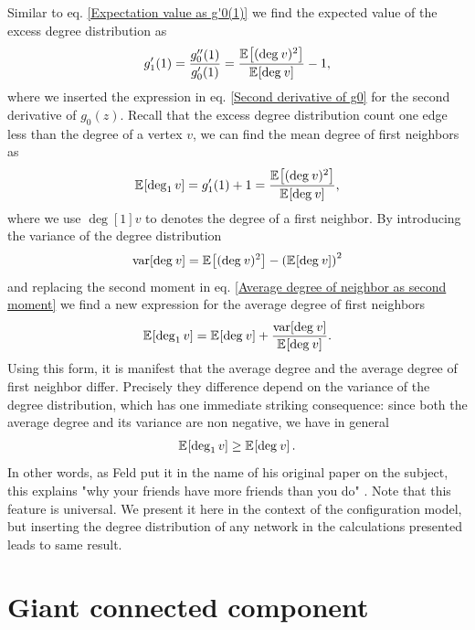 \documentclass[
11pt, %
english, %
singlespacing, %
nolistspacing, %
liststotoc, %
headsepline, %
]{MastersDoctoralThesis} %
\begin{document}
Similar to eq. \eqref{Expectation value as g'0(1)} we find the expected value of the excess degree distribution as
\begin{align}
	g'_1(1) = \frac{g''_0(1)}{g'_0(1)} = \frac{\expected{(\deg{v})^2}}{\expected{\deg{v}}} - 1,
\end{align}
where we inserted the expression in eq. \eqref{Second derivative of g0} for the second derivative of $g_0(z)$. Recall that the excess degree distribution count one edge less than the degree of a vertex $v$, we can find the mean degree of first neighbors as
\begin{align}
	\expected{\deg[1]{v}} = g'_1(1) + 1 = \frac{\expected{(\deg{v})^2}}{\expected{\deg{v}}}, \label{Average degree of neighbor as second moment}
\end{align}
where we use $\deg[1]{v}$ to denotes the degree of a first neighbor. By introducing the variance of the degree distribution
\begin{align}
	\var{\deg{v}} &= \expected{(\deg{v})^2} - \left(\expected{\deg{v}}\right)^2 \\
\end{align}
and replacing the second moment in eq. \eqref{Average degree of neighbor as second moment} we find a new expression for the average degree of first neighbors
\begin{align}
	\expected{\deg[1]{v}} = \expected{\deg{v}} + \frac{\var{\deg{v}}}{\expected{\deg{v}}}.
\end{align}
Using this form, it is manifest that the average degree and the average degree of first neighbor differ. Precisely they difference depend on the variance of the degree distribution, which has one immediate striking consequence: since both the average degree and its variance are non negative, we have in general
\begin{align}
	\expected{\deg[1]{v}} \geq \expected{\deg{v}}. \label{Friends of friends inequality}
\end{align}
In other words, as Feld put it in the name of his original paper on the subject, this explains "why your friends have more friends than you do" \cite{feld1991friends}. Note that this feature is universal. We present it here in the context of the configuration model, but inserting the degree distribution of any network in the calculations presented leads to same result.

\section{Giant connected component}
\label{Section: Giant connected component}
\end{document}
